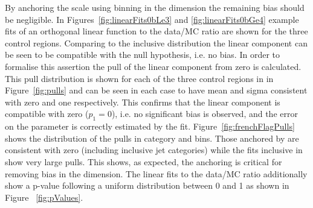 By anchoring the scale using binning in the \scalht dimension the remaining
bias should be negligible. In Figures~\ref{fig:linearFits0bLe3} and \ref{fig:linearFits0bGe4} 
example fits of an orthogonal linear function to the data/MC ratio 
are shown for the three control regions. Comparing to the inclusive distribution 
the linear component can be seen to be compatible with the null hypothesis, 
i.e. no bias. In order to formalise this assertion 
the pull of the linear component from zero is calculated.
This pull distribution is shown for each of the three control regions in
in Figure~\ref{fig:pulls} and can be seen in each case to have mean and sigma
consistent with zero and one respectively. This confirms that the linear component 
is compatible with zero ($p_1 = 0$), i.e. no significant bias is observed, 
and the error on the parameter is correctly estimated by the fit.
Figure~\ref{fig:frenchFlagPulls} shows the distribution of the pulls 
in category and \scalht bins. Those anchored by \scalht are consistent
with zero (including inclusive jet categories) while the fits inclusive in \scalht
show very large pulls. This shows, as expected, the \scalht anchoring
is critical for removing bias in the \mht dimension. The linear fits to the
data/MC ratio additionally show a p-value following 
a uniform distribution between 0 and 1 as shown in Figure ~\ref{fig:pValues}.


